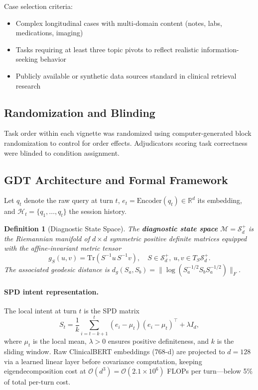 \documentclass[11pt]{article}
\newtheorem{definition}{Definition}
\begin{document}
Case selection criteria:
\begin{itemize}
  \item Complex longitudinal cases with multi-domain content (notes, labs, medications, imaging)
  \item Tasks requiring at least three topic pivots to reflect realistic information-seeking behavior
  \item Publicly available or synthetic data sources standard in clinical retrieval research
\end{itemize}

\subsection{Randomization and Blinding}
Task order within each vignette was randomized using computer-generated block randomization to control for order effects. Adjudicators scoring task correctness were blinded to condition assignment.

\subsection{GDT Architecture and Formal Framework}
\label{sec:gdt_arch}

Let $q_t$ denote the raw query at turn $t$, $e_t = \mathrm{Encoder}(q_t) \in \mathbb{R}^d$ its embedding, and $\mathcal{H}_t = \{q_1,\dots,q_t\}$ the session history.

\begin{definition}[Diagnostic State Space]
The \textbf{diagnostic state space} $\mathcal{M} = \mathcal{S}_d^+$ is the Riemannian manifold of $d\times d$ symmetric positive definite matrices equipped with the affine-invariant metric tensor
\begin{equation}
  g_S(u, v) = \mathrm{Tr}(S^{-1} u\, S^{-1} v), \quad S \in \mathcal{S}_d^+,\ u,v \in T_S\mathcal{S}_d^+.
  \label{eq:metric_tensor}
\end{equation}
The associated geodesic distance is $d_g(S_a, S_b) = \|\log(S_a^{-1/2} S_b S_a^{-1/2})\|_F$.
\end{definition}

\paragraph{SPD intent representation.}
The local intent at turn $t$ is the SPD matrix
\begin{equation}
  S_t = \frac{1}{k}\sum_{i=t-k+1}^{t}(e_i-\mu_t)(e_i-\mu_t)^{\top} + \lambda I_d,
  \label{eq:spdintent}
\end{equation}
where $\mu_t$ is the local mean, $\lambda > 0$ ensures positive definiteness, and $k$ is the sliding window. Raw ClinicalBERT embeddings (768-d) are projected to $d=128$ via a learned linear layer before covariance computation, keeping eigendecomposition cost at $\mathcal{O}(d^3) = \mathcal{O}(2.1\times10^6)$ FLOPs per turn—below 5\% of total per-turn cost.
\end{document}
